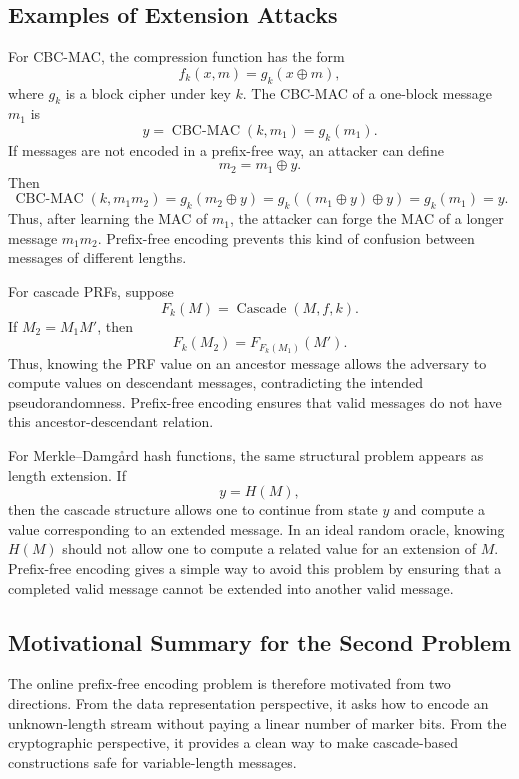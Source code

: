 \subsection{Examples of Extension Attacks}

For CBC-MAC, the compression function has the form
\[
    f_k(x,m) = g_k(x \oplus m),
\]
where \(g_k\) is a block cipher under key \(k\). The CBC-MAC of a one-block message \(m_1\) is
\[
    y = \operatorname{CBC\mbox{-}MAC}(k,m_1) = g_k(m_1).
\]
If messages are not encoded in a prefix-free way, an attacker can define
\[
    m_2 = m_1 \oplus y.
\]
Then
\[
    \operatorname{CBC\mbox{-}MAC}(k,m_1m_2)
    =
    g_k(m_2 \oplus y)
    =
    g_k((m_1 \oplus y)\oplus y)
    =
    g_k(m_1)
    =
    y.
\]
Thus, after learning the MAC of \(m_1\), the attacker can forge the MAC of a longer message \(m_1m_2\). Prefix-free encoding prevents this kind of confusion between messages of different lengths.

For cascade PRFs, suppose
\[
    F_k(M) = \operatorname{Cascade}(M,f,k).
\]
If \(M_2 = M_1M'\), then
\[
    F_k(M_2)
    =
    F_{F_k(M_1)}(M').
\]
Thus, knowing the PRF value on an ancestor message allows the adversary to compute values on descendant messages, contradicting the intended pseudorandomness. Prefix-free encoding ensures that valid messages do not have this ancestor-descendant relation.

For Merkle--Damg{\aa}rd hash functions, the same structural problem appears as length extension. If
\[
    y = H(M),
\]
then the cascade structure allows one to continue from state \(y\) and compute a value corresponding to an extended message. In an ideal random oracle, knowing \(H(M)\) should not allow one to compute a related value for an extension of \(M\). Prefix-free encoding gives a simple way to avoid this problem by ensuring that a completed valid message cannot be extended into another valid message.

\subsection{Motivational Summary for the Second Problem}

The online prefix-free encoding problem is therefore motivated from two directions. From the data representation perspective, it asks how to encode an unknown-length stream without paying a linear number of marker bits. From the cryptographic perspective, it provides a clean way to make cascade-based constructions safe for variable-length messages.

